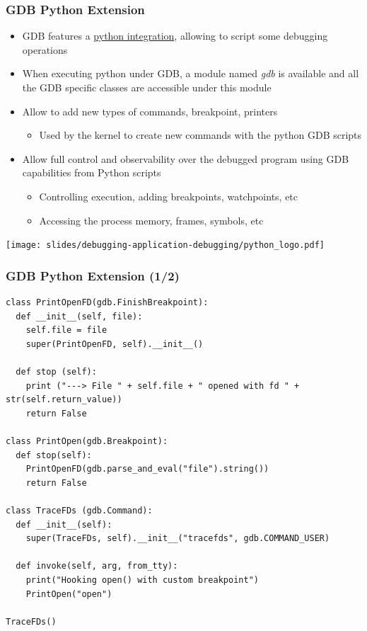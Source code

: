 \begin{frame}
  \frametitle{GDB Python Extension}
  \begin{itemize}
    \item GDB features a \href{https://sourceware.org/gdb/onlinedocs/gdb/Python.html}{python integration},
          allowing to script some debugging operations
    \item When executing python under GDB, a module named {\em gdb} is available
          and all the GDB specific classes are accessible under this module
    \item Allow to add new types of commands, breakpoint, printers
    \begin{itemize}
      \item Used by the kernel to create new commands with the python GDB scripts
    \end{itemize}
    \item Allow full control and observability over the debugged program using
          GDB capabilities from Python scripts
    \begin{itemize}
      \item Controlling execution, adding breakpoints, watchpoints, etc
      \item Accessing the process memory, frames, symbols, etc
    \end{itemize}
  \end{itemize}
  \begin{center}
    \texttt{[image: slides/debugging-application-debugging/python\_logo.pdf]}
  \end{center}
\end{frame}

\begin{frame}[fragile]
  \frametitle{GDB Python Extension (1/2)}
  \begin{block}{}
    \begin{verbatim}
class PrintOpenFD(gdb.FinishBreakpoint):
  def __init__(self, file):
    self.file = file
    super(PrintOpenFD, self).__init__()

  def stop (self):
    print ("---> File " + self.file + " opened with fd " + str(self.return_value))
    return False

class PrintOpen(gdb.Breakpoint):
  def stop(self):
    PrintOpenFD(gdb.parse_and_eval("file").string())
    return False

class TraceFDs (gdb.Command):
  def __init__(self):
    super(TraceFDs, self).__init__("tracefds", gdb.COMMAND_USER)

  def invoke(self, arg, from_tty):
    print("Hooking open() with custom breakpoint")
    PrintOpen("open")

TraceFDs()
    \end{verbatim}
  \end{block}
\end{frame}

